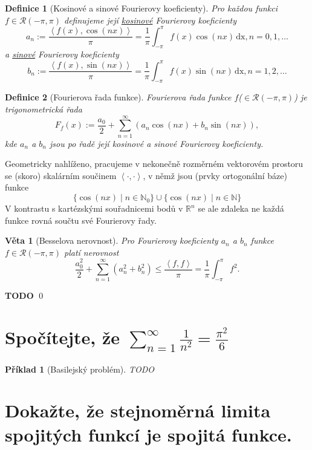 \documentclass[11pt]{article}
\theoremstyle{nontheoremstyle}
\newtheorem*{definition}{Definice}
\newtheorem*{example}{Příklad}
\renewenvironment{proof}{{\noindent\bfseries Důkaz:}}{\qed}
\theoremstyle{nontheoremstylenodot}
\theoremstyle{theoremstyle}
\newtheorem*{theorem}{Věta}
\begin{document}
\begin{definition}[Kosinové a sinové Fourierovy koeficienty]
    Pro každou funkci $f \in \mathcal{R}(-\pi,\pi)$ definujeme její
    \underline{kosinové} Fourierovy koeficienty
    \[ a_n := \frac{\left< f(x), \cos(nx) \right>}{\pi} = \frac{1}{\pi}\int_{-\pi}^{\pi}f(x)\cos(nx)\,\text{dx}, n = 0,1,\dots \]
    a \underline{sinové} Fourierovy koeficienty
    \[ b_n := \frac{\left< f(x), \sin(nx) \right>}{\pi} = \frac{1}{\pi}\int_{-\pi}^{\pi}f(x)\sin(nx)\,\text{dx}, n = 1,2,\dots \]
\end{definition}

\begin{definition}[Fourierova řada funkce]
    Fourierova řada funkce $f$($\in \mathcal{R}(-\pi,\pi)$) je trigonometrická řada
    \[ F_f(x) := \frac{a_0}{2} + \sum_{n=1}^{\infty} \left( a_n \cos(nx) + b_n \sin(nx) \right), \]
    kde $a_n$ a $b_n$ jsou po řadě její kosinové a sinové Fourierovy koeficienty.
\end{definition}

\noindent
Geometricky nahlíženo, pracujeme v nekonečně rozměrném vektorovém prostoru se (skoro) skalárním součinem $\left<\cdot,\cdot\right>$,
v němž jsou (prvky ortogonální báze) funkce
\[ \{ \cos(nx) \mid n\in \mathbb{N}_0 \} \cup \{ \cos(nx) \mid n\in \mathbb{N} \} \]
V kontrastu s kartézskými souřadnicemi bodů v $\mathbb{R}^n$ se ale zdaleka ne každá funkce rovná součtu
své Fourierovy řady.

\begin{theorem}[Besselova nerovnost]
    Pro Fourierovy koeficienty $a_n$ a $b_n$ funkce $f \in \mathcal{R}(-\pi,\pi)$ platí nerovnost
    \[ \frac{a_0^2}{2} + \sum_{n=1}^{\infty}(a_n^2+b_n^2) \leq \frac{\left<f,f\right>}{\pi} = \frac{1}{\pi}\int_{-\pi}^{\pi}f^2. \]
\end{theorem}
\begin{proof}
    \LARGE
    \textbf{TODO}
\end{proof}

\section{Spočítejte, že $ \sum_{n=1}^{\infty} \frac{1}{n^2} = \frac{\pi^2}{6} $}

\begin{example}[Basilejský problém]
    \LARGE
    TODO
\end{example}

\section{Dokažte, že stejnoměrná limita spojitých funkcí je spojitá funkce.}
\end{document}
